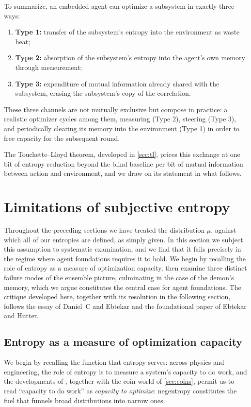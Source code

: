 \documentclass[11pt]{article}
\begin{document}
To summarize, an embedded agent can optimize a subsystem in exactly three ways:
\begin{enumerate}[leftmargin=2em]
  \item \textbf{Type 1:} transfer of the subsystem's entropy into the environment as waste heat;
  \item \textbf{Type 2:} absorption of the subsystem's entropy into the agent's own memory through measurement;
  \item \textbf{Type 3:} expenditure of mutual information already shared with the subsystem, erasing the subsystem's copy of the correlation.
\end{enumerate}
These three channels are not mutually exclusive but compose in practice: a realistic optimizer cycles among them, measuring (Type 2), steering (Type 3), and periodically clearing its memory into the environment (Type 1) in order to free capacity for the subsequent round.

The Touchette--Lloyd theorem, developed in \cref{sec:tl}, prices this exchange at one bit of entropy reduction beyond the blind baseline per bit of mutual information between action and environment, and we draw on its statement in what follows.
\section{Limitations of subjective entropy}
\label{sec:subjective}

Throughout the preceding sections we have treated the distribution $\mu$, against which all of our entropies are defined, as simply given. In this section we subject this assumption to systematic examination, and we find that it fails precisely in the regime where agent foundations requires it to hold. We begin by recalling the role of entropy as a measure of optimization capacity, then examine three distinct failure modes of the ensemble picture, culminating in the case of the demon's memory, which we argue constitutes the central case for agent foundations. The critique developed here, together with its resolution in the following section, follows the essay of Daniel~C and Ebtekar and the foundational paper of Ebtekar and Hutter.

\subsection{Entropy as a measure of optimization capacity}
\label{sec:capacity}

We begin by recalling the function that entropy serves: across physics and engineering, the role of entropy is to measure a system's capacity to do work, and the developments of , together with the coin world of \cref{sec:coins}, permit us to read ``capacity to do work'' as \emph{capacity to optimize}: negentropy constitutes the fuel that funnels broad distributions into narrow ones.
\end{document}
